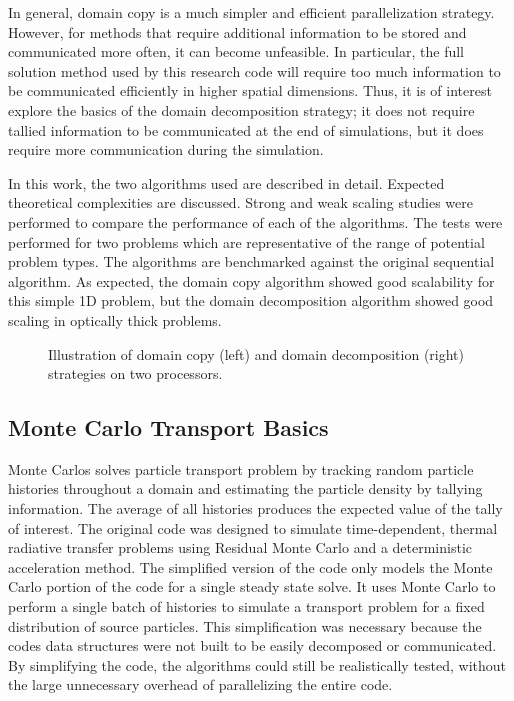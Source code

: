 \documentclass[12pt]{article}
\begin{document}
In general, domain copy is a much simpler and efficient parallelization strategy.  However, for
methods that require additional information to be stored
and communicated more often, it can become unfeasible.  In particular, the full
solution method used by this research code will require too much information to be
communicated efficiently in higher spatial dimensions. Thus, it is of interest
explore the basics of the domain decomposition strategy; it does not require tallied information to be communicated at the end of
simulations, but it does require more communication during the simulation.

In this work, the two algorithms used are described in detail.  Expected theoretical
complexities are discussed.
Strong and weak scaling studies were performed to compare the performance of each of
the algorithms.  The tests were performed for two problems which are representative
of the range of potential problem types.  The algorithms are benchmarked
against the original sequential algorithm. As expected, the domain copy algorithm
showed good scalability for this simple 1D problem, but the domain decomposition
algorithm showed good scaling in optically thick problems.
\begin{figure}[hb!]
    \centering
    \def\svgwidth{0.9\textwidth}
    
    \caption{Illustration of domain copy (left) and domain decomposition (right)
        strategies on two processors. \label{hawt}}
    \end{figure}

\subsection{Monte Carlo Transport Basics}

Monte Carlos solves particle transport problem by tracking random particle histories
throughout a domain and estimating the particle density by tallying information. The
average of all histories produces the expected value of the tally of interest.
The original code was designed to simulate time-dependent, thermal radiative transfer
problems using Residual Monte Carlo and a deterministic acceleration method.  
The simplified version of the code only models the Monte Carlo portion of the code for
a single steady state solve.  It uses Monte Carlo to perform a single batch of
histories to simulate a transport problem for a fixed distribution of source particles.  This simplification was necessary because the
codes data structures were not built to be easily decomposed or communicated.  By
simplifying the code, the algorithms could still be realistically tested, without the
large unnecessary overhead of parallelizing the entire code. 
\end{document}
